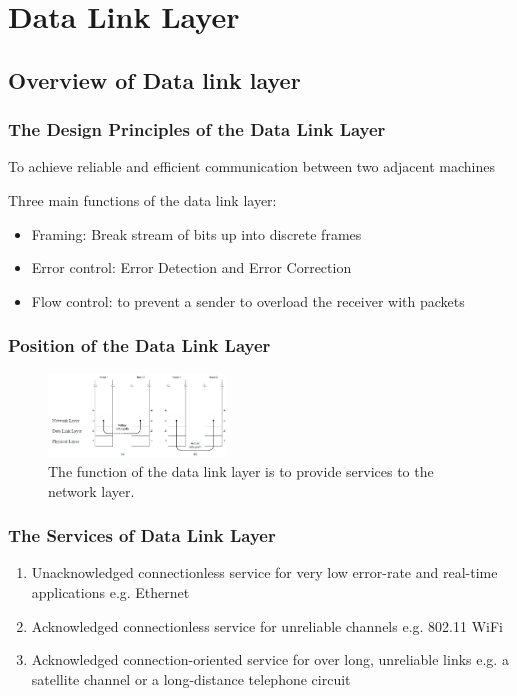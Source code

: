 \newpage
\section{Data Link Layer}
\subsection{Overview of Data link layer}
\subsubsection{The Design Principles of the Data Link Layer}

To achieve reliable and efficient communication between two adjacent machines

Three main functions of the data link layer:
\begin{itemize}
    \item Framing: Break stream of bits up into discrete frames
    \item Error control: Error Detection and Error Correction
    \item Flow control: to prevent a sender to overload the receiver with packets
\end{itemize}

\subsubsection{Position of the Data Link Layer}
\begin{figure}[!htb]
    \centering
    \includegraphics[width=0.42\textwidth]{pic/CN3/The function of the data link layer is to provide services to the network layer.}
    \caption{The function of the data link layer is to provide services to the network layer.}
\end{figure}

\subsubsection{The Services of Data Link Layer}
\begin{enumerate}
    \item Unacknowledged connectionless service
    \subitem for very low error-rate and real-time applications
    \subitem e.g. Ethernet
    \item Acknowledged connectionless service
    \subitem for unreliable channels
    \subitem e.g. 802.11 WiFi
    \item Acknowledged connection-oriented service
    \subitem for over long, unreliable links
    \subitem e.g. a satellite channel or a long-distance telephone circuit
\end{enumerate}

